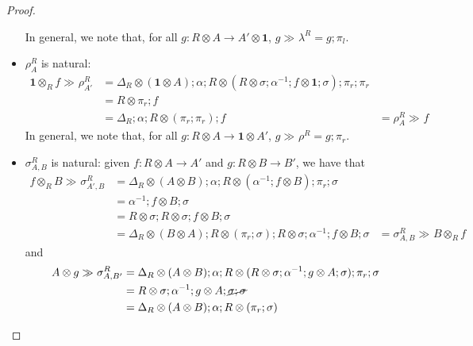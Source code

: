 \documentclass[acmsmall,screen,review]{acmart}
\newcommand{\mb}[1]{\ensuremath{\mathbf{#1}}}
\newcommand{\dmor}[1]{{\Delta}_{#1}}
\newcommand{\rseq}[3]{#2 \gg_{#1} #3}
\begin{document}
\begin{proof}
\begin{itemize}
\begin{equation}
    \end{equation}
    In general, we note that, for all $g : R \otimes A \to A' \otimes \mb{1}$, 
    $\rseq{}{g}{\lambda^R} = g ; \pi_l$.
    \item $\rho^R_{A}$ is natural:
    \begin{equation}
      \begin{aligned}
      \rseq{}{\mb{1} \otimes_R f}{\rho^R_{A'}}
      & = \dmor{R} \otimes (\mb{1} \otimes A) ; \alpha 
        ; R \otimes (R \otimes \sigma ; \alpha^{-1} ; f \otimes \mb{1} ; \sigma) 
        ; \pi_r ; \pi_r \\
      & = R \otimes \pi_r ; f \\
      & = \dmor{R} ; \alpha ; R \otimes (\pi_r ; \pi_r) ; f
      & = \rseq{}{\rho^R_{A}}{f}
      \end{aligned}
    \end{equation}
    In general, we note that, for all $g : R \otimes A \to \mb{1} \otimes A'$, 
    $\rseq{}{g}{\rho^R} = g ; \pi_r$.
    \item $\sigma^R_{A, B}$ is natural: given $f : R \otimes A \to A'$ and $g : R \otimes B \to B'$, 
    we have that
    \begin{equation}
      \begin{aligned}
      \rseq{}{f \otimes_R B}{\sigma^R_{A', B}}  
        & = \dmor{R} \otimes (A \otimes B) ; \alpha 
          ; R \otimes (\alpha^{-1} ; f \otimes B) ; \pi_r ; \sigma \\
        & = \alpha^{-1} ; f \otimes B ; \sigma \\
        & = R \otimes \sigma ; R \otimes \sigma ; f \otimes B ; \sigma \\
        & = \dmor{R} \otimes (B \otimes A) ; R \otimes (\pi_r ; \sigma) 
          ; R \otimes \sigma ; \alpha^{-1} ; f \otimes B ; \sigma
        & = \rseq{}{\sigma^R_{A, B}}{B \otimes_R f}
      \end{aligned}
    \end{equation}
    and
    \begin{equation}
      \begin{aligned}
      \rseq{}{A \otimes g}{\sigma^R_{A, B'}} 
        &= \dmor{R} \otimes (A \otimes B) ; \alpha 
        ; R \otimes (R \otimes \sigma ; \alpha^{-1} ; g \otimes A ; \sigma)
        ; \pi_r ; \sigma \\
        &= R \otimes \sigma ; \alpha^{-1} ; g \otimes A ; \cancel{\sigma ; \sigma} \\
        &= \dmor{R} \otimes (A \otimes B) ; \alpha ; R \otimes (\pi_r ; \sigma) 

\end{aligned}
\end{equation}
\end{itemize}
\end{proof}
\end{document}
